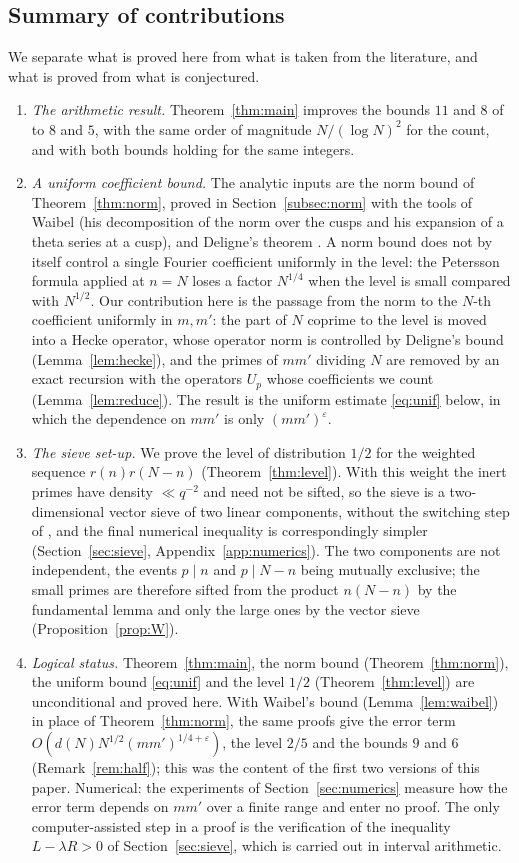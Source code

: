 \documentclass[11pt]{amsart}
\theoremstyle{remark}
\newcommand{\e}{\varepsilon}
\begin{document}
\subsection*{Summary of contributions}
We separate what is proved here from what is taken from the literature, and what is proved from what is conjectured.
\begin{enumerate}[label=(\alph*),leftmargin=2em]
\item \emph{The arithmetic result.} Theorem~\ref{thm:main} improves the bounds $11$ and $8$ of \cite{Chen2} to $8$ and $5$, with the same order of magnitude $N/(\log N)^2$ for the count, and with both bounds holding for the same integers.
\item \emph{A uniform coefficient bound.} The analytic inputs are the norm bound of Theorem~\ref{thm:norm}, proved in Section~\ref{subsec:norm} with the tools of Waibel \cite{Waibel} (his decomposition of the norm over the cusps and his expansion of a theta series at a cusp), and Deligne's theorem \cite{Deligne}. A norm bound does not by itself control a single Fourier coefficient uniformly in the level: the Petersson formula applied at $n=N$ loses a factor $N^{1/4}$ when the level is small compared with $N^{1/2}$. Our contribution here is the passage from the norm to the $N$-th coefficient uniformly in $m,m'$: the part of $N$ coprime to the level is moved into a Hecke operator, whose operator norm is controlled by Deligne's bound (Lemma~\ref{lem:hecke}), and the primes of $mm'$ dividing $N$ are removed by an exact recursion with the operators $U_p$ whose coefficients we count (Lemma~\ref{lem:reduce}). The result is the uniform estimate \eqref{eq:unif} below, in which the dependence on $mm'$ is only $(mm')^\e$.
\item \emph{The sieve set-up.} We prove the level of distribution $1/2$ for the weighted sequence $r(n)r(N-n)$ (Theorem~\ref{thm:level}). With this weight the inert primes have density $\ll q^{-2}$ and need not be sifted, so the sieve is a two-dimensional vector sieve of two linear components, without the switching step of \cite{Chen2}, and the final numerical inequality is correspondingly simpler (Section~\ref{sec:sieve}, Appendix~\ref{app:numerics}). The two components are not independent, the events $p\mid n$ and $p\mid N-n$ being mutually exclusive; the small primes are therefore sifted from the product $n(N-n)$ by the fundamental lemma and only the large ones by the vector sieve (Proposition~\ref{prop:W}).
\item \emph{Logical status.} Theorem~\ref{thm:main}, the norm bound (Theorem~\ref{thm:norm}), the uniform bound \eqref{eq:unif} and the level $1/2$ (Theorem~\ref{thm:level}) are unconditional and proved here. With Waibel's bound (Lemma~\ref{lem:waibel}) in place of Theorem~\ref{thm:norm}, the same proofs give the error term $O(d(N)N^{1/2}(mm')^{1/4+\e})$, the level $2/5$ and the bounds $9$ and $6$ (Remark~\ref{rem:half}); this was the content of the first two versions of this paper. Numerical: the experiments of Section~\ref{sec:numerics} measure how the error term depends on $mm'$ over a finite range and enter no proof. The only computer-assisted step in a proof is the verification of the inequality $L-\lambda R>0$ of Section~\ref{sec:sieve}, which is carried out in interval arithmetic.

\end{enumerate}
\end{document}

